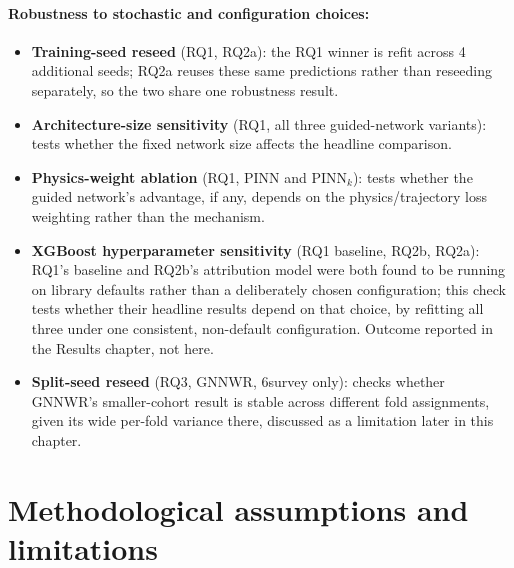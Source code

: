 \documentclass[11pt,a4paper]{report}
\begin{document}
\paragraph*{Robustness to stochastic and configuration choices:} 
\begin{itemize}
\setlength\itemsep{0pt}
\item \textbf{Training-seed reseed} (RQ1, RQ2a): the RQ1 winner is refit across 4 additional
  seeds; RQ2a reuses these same predictions rather than reseeding separately, so the two share one
  robustness result.
\item \textbf{Architecture-size sensitivity} (RQ1, all three guided-network variants): tests
  whether the fixed network size affects the headline comparison.
\item \textbf{Physics-weight ablation} (RQ1, PINN and PINN$_k$): tests whether the guided
  network's advantage, if any, depends on the physics/trajectory loss weighting rather than the
  mechanism.
\item \textbf{XGBoost hyperparameter sensitivity} (RQ1 baseline, RQ2b, RQ2a): RQ1's baseline and
  RQ2b's attribution model were both found to be running on library defaults rather than a
  deliberately chosen configuration; this check tests whether their headline results depend on
  that choice, by refitting all three under one consistent, non-default configuration. Outcome
  reported in the Results chapter, not here.
\item \textbf{Split-seed reseed} (RQ3, GNNWR, 6survey only): checks whether GNNWR's
  smaller-cohort result is stable across different fold assignments, given its wide per-fold
  variance there, discussed as a limitation later in this chapter.
\end{itemize}


\section{Methodological assumptions and limitations}

\end{document}
